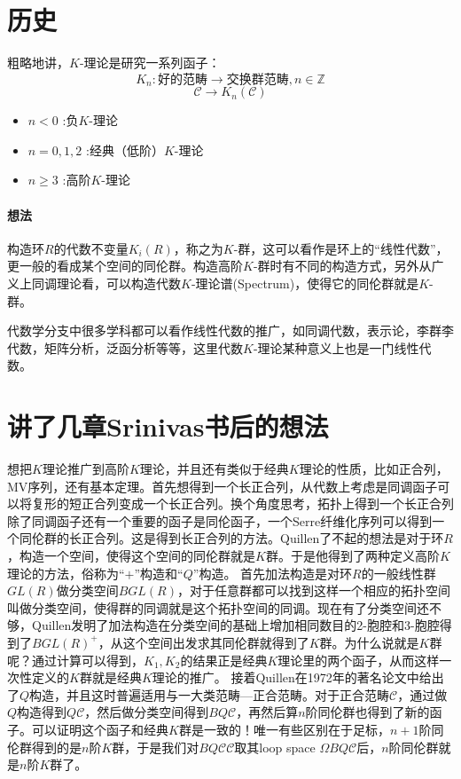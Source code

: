 \section{历史}
粗略地讲，$K$-理论是研究一系列函子：
\[K_n: \text{好的范畴} \longrightarrow \text{交换群范畴},n\in \mathbb{Z}\]
\[\mathcal{C}\longrightarrow K_n(\mathcal{C})\]
\begin{itemize}
	\item  $n<0$  :负$K$-理论
	\item  $n=0,1,2$ :经典（低阶）$K$-理论
	\item  $n\geq 3$ :高阶$K$-理论
\end{itemize}
\paragraph{想法}
构造环$R$的代数不变量$K_i(R)$，称之为$K$-群，这可以看作是环上的“线性代数”，更一般的看成某个空间的同伦群。构造高阶$K$-群时有不同的构造方式，另外从广义上同调理论看，可以构造代数$K$-理论谱(Spectrum)，使得它的同伦群就是$K$-群。

代数学分支中很多学科都可以看作线性代数的推广，如同调代数，表示论，李群李代数，矩阵分析，泛函分析等等，这里代数$K$-理论某种意义上也是一门线性代数。




\section{讲了几章Srinivas书后的想法}
想把$K$理论推广到高阶$K$理论，并且还有类似于经典$K$理论的性质，比如正合列，MV序列，还有基本定理。首先想得到一个长正合列，从代数上考虑是同调函子可以将复形的短正合列变成一个长正合列。换个角度思考，拓扑上得到一个长正合列除了同调函子还有一个重要的函子是同伦函子，一个Serre纤维化序列可以得到一个同伦群的长正合列。这是得到长正合列的方法。Quillen了不起的想法是对于环$R$，构造一个空间，使得这个空间的同伦群就是$K$群。于是他得到了两种定义高阶$K$理论的方法，俗称为“$+$”构造和“$Q$”构造。
首先加法构造是对环$R$的一般线性群$GL(R)$做分类空间$BGL(R)$，对于任意群都可以找到这样一个相应的拓扑空间叫做分类空间，使得群的同调就是这个拓扑空间的同调。现在有了分类空间还不够，Quillen发明了加法构造在分类空间的基础上增加相同数目的2-胞腔和3-胞腔得到了$BGL(R)^+$，从这个空间出发求其同伦群就得到了$K$群。为什么说就是$K$群呢？通过计算可以得到，$K_1,K_2$的结果正是经典$K$理论里的两个函子，从而这样一次性定义的$K$群就是经典$K$理论的推广。
接着Quillen在1972年的著名论文中给出了$Q$构造，并且这时普遍适用与一大类范畴---正合范畴。对于正合范畴$\mathcal{C}$，通过做$Q$构造得到$Q\mathcal{C}$，然后做分类空间得到$BQ\mathcal{C}$，再然后算$n$阶同伦群也得到了新的函子。可以证明这个函子和经典$K$群是一致的！唯一有些区别在于足标，$n+1$阶同伦群得到的是$n$阶$K$群，于是我们对$BQ\mathcal{C}\mathcal{C}$取其loop space $\Omega BQ\mathcal{C}$后，$n$阶同伦群就是$n$阶$K$群了。

